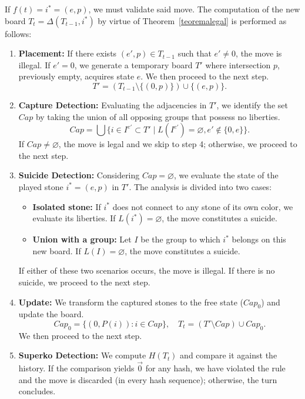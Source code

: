 If $f(t) = i^{*} = (e, p)$, we must validate said move. The computation of the new board $T_t = \Delta(T_{t-1}, i^{*})$ by virtue of Theorem~\ref{teoremalegal} is performed as follows:
\begin{enumerate}
	\item \textbf{Placement:} If there exists $(e',p)\in T_{t-1}$ such that $e' \neq 0$, the move is illegal. If $e'=0$, we generate a temporary board $T'$ where intersection $p$, previously empty, acquires state $e$. We then proceed to the next step.
	$$T' = \left(T_{t-1} \setminus \{(0, p)\}\right) \cup \{(e, p)\}.$$
	
	\item \textbf{Capture Detection:} Evaluating the adjacencies in $T'$, we identify the set $Cap$ by taking the union of all opposing groups that possess no liberties.
	$$Cap = \bigcup \{ i\in I^{e'} \subset T' \mid L(I^{e'}) = \varnothing, e' \notin \{0, e\}\}.$$If $Cap \neq \varnothing$, the move is legal and we skip to step 4; otherwise, we proceed to the next step.
	
	\item \textbf{Suicide Detection:} Considering $Cap = \varnothing$, we evaluate the state of the played stone $i^* = (e, p)$ in $T'$. The analysis is divided into two cases:
	\begin{itemize}
		\item \textbf{Isolated stone:} If $i^*$ does not connect to any stone of its own color, we evaluate its liberties. If $L(i^*) = \varnothing$, the move constitutes a suicide.
		\item \textbf{Union with a group:} Let $I$ be the group to which $i^*$ belongs on this new board. If $L(I) = \varnothing$, the move constitutes a suicide.
	\end{itemize}
	If either of these two scenarios occurs, the move is illegal. If there is no suicide, we proceed to the next step.
	
	\item \textbf{Update:} We transform the captured stones to the free state ($Cap_0$) and update the board.$$Cap_0 = \{(0, P(i)) : i \in Cap\},\quad T_t = (T' \setminus Cap) \cup Cap_0.$$
	We then proceed to the next step.
	
	\item \textbf{Superko Detection:}
	We compute \(H(T_t)\) and compare it against the history. If the comparison yields \(\vec{0}\) for any hash, we have violated the rule and the move is discarded (in every hash sequence); otherwise, the turn concludes.
	\end{enumerate}
	
